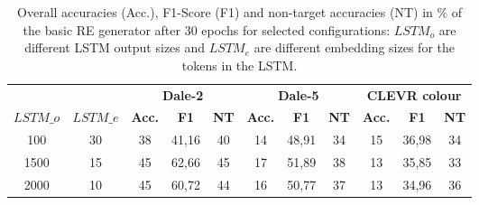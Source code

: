 \begin{table}[ht]
    \centering
    \begin{tabular}{cc|ccc|ccc|ccc}
        \toprule
                  &           & \multicolumn{3}{c}{\textbf{Dale-2}} & \multicolumn{3}{c}{\textbf{Dale-5}} & \multicolumn{3}{c}{\textbf{CLEVR colour}}                                                                                         \\  \cmidrule(lr){3-5}\cmidrule(lr){6-8}\cmidrule(lr){9-11}
        $LSTM\_o$ & $LSTM\_e$ & \textbf{Acc.}                       & \textbf{F1}                         & \textbf{NT}                               & \textbf{Acc.} & \textbf{F1} & \textbf{NT} & \textbf{Acc.} & \textbf{F1} & \textbf{NT} \\\midrule
        {100}     & {30}      & {38}                                & {41,16}                             & {40}                                      & {14}          & {48,91}     & {34}        & {15}          & {36,98}     & {34}        \\
        {1500}    & {15}      & {45}                                & {62,66}                             & {45}                                      & {17}          & {51,89}     & {38}        & {13}          & {35,85}     & {33}        \\
        {2000}    & {10}      & {45}                                & {60,72}                             & {44}                                      & {16}          & {50,77}     & {37}        & {13}          & {34,96}     & {36}        \\
        \bottomrule
    \end{tabular}
    \caption{Overall accuracies (Acc.), F1-Score (F1) and non-target accuracies (NT) in \% of the basic RE generator after 30 epochs for selected configurations: $LSTM_o$ are different LSTM output sizes and $LSTM_e$ are different embedding sizes for the tokens in the LSTM.}
    \label{tab:results:basic-re-generator}
\end{table}

